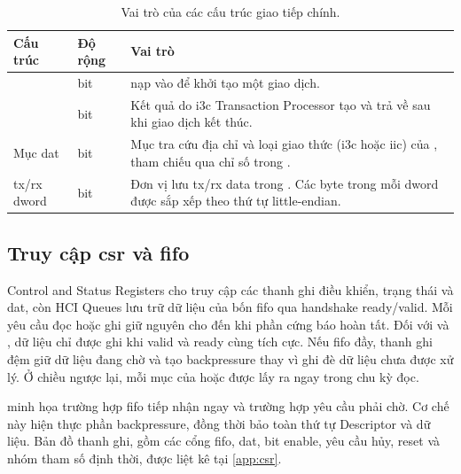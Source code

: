 \begin{table}[!htbp]
	\centering
	\caption{Vai trò của các cấu trúc giao tiếp chính.}
	\label{tab:desc-summary}
	\begin{tabular}{L{3.8cm} C{2.0cm} L{7.3cm}}
		\toprule
		\textbf{Cấu trúc}                  & \textbf{Độ rộng}               & \textbf{Vai trò}                                                                                                                  \\
		\midrule
		\CommandDescriptor{}               & \CommandDescriptorWidth{} bit  & \Host{} nạp vào \CommandFifo{} để khởi tạo một giao dịch.                                                                         \\
		\ResponseDescriptor{}              & \ResponseDescriptorWidth{} bit & Kết quả do \gls{i3c} Transaction Processor tạo và trả về \Host{} sau khi giao dịch kết thúc.                                      \\
		Mục \gls{dat}                      & \DatEntryWidth{} bit           & Mục tra cứu địa chỉ và loại giao thức (\gls{i3c} hoặc \gls{iic}) của \Target{}, tham chiếu qua chỉ số trong \CommandDescriptor{}. \\
		\gls{tx}/\acrshort{rx} \gls{dword} & \DataBufferWordWidth{} bit     & Đơn vị lưu \gls{tx}/\acrshort{rx} data trong \TxRxFifo{}. Các byte trong mỗi \gls{dword} được sắp xếp theo thứ tự little-endian.  \\
		\bottomrule
	\end{tabular}
\end{table}

\subsection{Truy cập \texorpdfstring{\gls{csr} và \gls{fifo}}{CSR và FIFO}}
\label{sec:rtl-csr}
\label{sec:rtl-queues}

Control and Status Registers cho \Host{} truy cập các thanh ghi điều khiển, trạng thái và \gls{dat}, còn HCI Queues
lưu trữ dữ liệu của bốn \gls{fifo} qua handshake ready/valid. Mỗi yêu cầu đọc hoặc ghi giữ nguyên cho
đến khi phần cứng báo hoàn tất. Đối với \CommandFifo{} và \TxFifo{}, dữ liệu chỉ được ghi khi valid
và ready cùng tích cực. Nếu \gls{fifo} đầy, thanh ghi đệm giữ dữ liệu đang chờ và tạo backpressure
thay vì ghi đè dữ liệu chưa được xử lý. Ở chiều ngược lại, mỗi mục của \RxFifo{} hoặc
\ResponseFifo{} được lấy ra ngay trong chu kỳ \Host{} đọc.

 minh họa trường hợp \gls{fifo} tiếp nhận ngay và trường hợp yêu cầu phải chờ. Cơ chế này hiện thực phần backpressure, đồng thời bảo toàn thứ tự Descriptor và dữ liệu. Bản đồ thanh ghi, gồm các cổng \gls{fifo}, \gls{dat}, bit enable, yêu cầu hủy, reset và nhóm tham số định thời, được liệt kê tại \cref{app:csr}.

